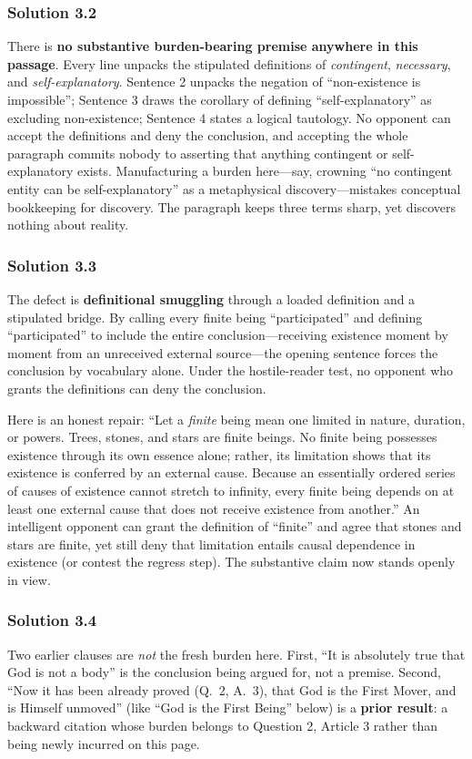 \subsubsection*{Solution 3.2}
There is \textbf{no substantive burden-bearing premise anywhere in this passage}. Every line unpacks the stipulated definitions of \emph{contingent}, \emph{necessary}, and \emph{self-explanatory}. Sentence 2 unpacks the negation of ``non-existence is impossible''; Sentence 3 draws the corollary of defining ``self-explanatory'' as excluding non-existence; Sentence 4 states a logical tautology. No opponent can accept the definitions and deny the conclusion, and accepting the whole paragraph commits nobody to asserting that anything contingent or self-explanatory exists. Manufacturing a burden here---say, crowning ``no contingent entity can be self-explanatory'' as a metaphysical discovery---mistakes conceptual bookkeeping for discovery. The paragraph keeps three terms sharp, yet discovers nothing about reality.

\subsubsection*{Solution 3.3}
The defect is \textbf{definitional smuggling} through a loaded definition and a stipulated bridge. By calling every finite being ``participated'' and defining ``participated'' to include the entire conclusion---receiving existence moment by moment from an unreceived external source---the opening sentence forces the conclusion by vocabulary alone. Under the hostile-reader test, no opponent who grants the definitions can deny the conclusion.

Here is an honest repair: ``Let a \emph{finite} being mean one limited in nature, duration, or powers. Trees, stones, and stars are finite beings. No finite being possesses existence through its own essence alone; rather, its limitation shows that its existence is conferred by an external cause. Because an essentially ordered series of causes of existence cannot stretch to infinity, every finite being depends on at least one external cause that does not receive existence from another.'' An intelligent opponent can grant the definition of ``finite'' and agree that stones and stars are finite, yet still deny that limitation entails causal dependence in existence (or contest the regress step). The substantive claim now stands openly in view.

\subsubsection*{Solution 3.4}
Two earlier clauses are \emph{not} the fresh burden here. First, ``It is absolutely true that God is not a body'' is the conclusion being argued for, not a premise. Second, ``Now it has been already proved (Q.\ 2, A.\ 3), that God is the First Mover, and is Himself unmoved'' (like ``God is the First Being'' below) is a \textbf{prior result}: a backward citation whose burden belongs to Question 2, Article 3 rather than being newly incurred on this page.

